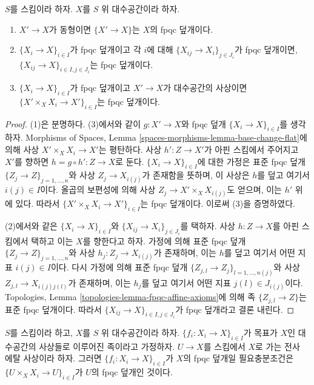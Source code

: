 \begin{lemma}
\label{lemma-fpqc}
$S$를 스킴이라 하자. $X$를 $S$ 위 대수공간이라 하자.
\begin{enumerate}
\item $X' \to X$가 동형이면 $\{X' \to X\}$는 $X$의 fpqc 덮개이다.
\item $\{X_i \to X\}_{i\in I}$가 fpqc 덮개이고 각 $i$에 대해
$\{X_{ij} \to X_i\}_{j\in J_i}$가 fpqc 덮개이면,
$\{X_{ij} \to X\}_{i \in I, j\in J_i}$는 fpqc 덮개이다.
\item $\{X_i \to X\}_{i\in I}$가 fpqc 덮개이고 $X' \to X$가
대수공간의 사상이면
$\{X' \times_X X_i \to X'\}_{i\in I}$는 fpqc 덮개이다.
\end{enumerate}
\end{lemma}

\begin{proof}
(1)은 분명하다. (3)에서와 같이 $g : X' \to X$와 fpqc 덮개
$\{X_i \to X\}_{i\in I}$를 생각하자. Morphisms of Spaces, Lemma
\ref{spaces-morphisms-lemma-base-change-flat}에 의해 사상
$X' \times_X X_i \to X'$는 평탄하다. 사상 $h' : Z \to X'$가 아핀
스킴에서 주어지고 $X'$를 향하면 $h = g \circ h' : Z \to X$로 둔다.
$\{X_i \to X\}_{i\in I}$에 대한 가정은 표준 fpqc 덮개
$\{Z_j \to Z\}_{j = 1, \ldots, n}$와 사상 $Z_j \to X_{i(j)}$가
존재함을 뜻하며, 이 사상은 $h$를 덮고 여기서 $i(j) \in I$이다. 올곱의
보편성에 의해 사상 $Z_j \to X' \times_X X_{i(j)}$도 얻으며, 이는
$h'$ 위에 있다. 따라서 $\{X' \times_X X_i \to X'\}_{i\in I}$는 fpqc
덮개이다. 이로써 (3)을 증명하였다.

\medskip\noindent
(2)에서와 같은 $\{X_i \to X\}_{i\in I}$와
$\{X_{ij} \to X_i\}_{j\in J_i}$를 택하자. 사상 $h : Z \to X$를 아핀
스킴에서 택하고 이는 $X$를 향한다고 하자. 가정에 의해 표준 fpqc 덮개
$\{Z_j \to Z\}_{j = 1, \ldots, n}$와 사상
$h_j : Z_j \to X_{i(j)}$가 존재하며, 이는 $h$를 덮고 여기서 어떤 지표
$i(j) \in I$이다. 다시 가정에 의해 표준 fpqc 덮개
$\{Z_{j, l} \to Z_j\}_{l = 1, \ldots, n(j)}$와 사상
$Z_{j, l} \to X_{i(j)j(l)}$가 존재하며, 이는 $h_j$를 덮고 여기서 어떤
지표 $j(l) \in J_{i(j)}$이다. Topologies, Lemma
\ref{topologies-lemma-fpqc-affine-axioms}에 의해 족
$\{Z_{j, l} \to Z\}$는 표준 fpqc 덮개이다. 따라서
$\{X_{ij} \to X\}_{i \in I, j\in J_i}$가 fpqc 덮개라고 결론 내린다.
\end{proof}

\begin{lemma}
\label{lemma-recognize-fpqc-covering}
$S$를 스킴이라 하고, $X$를 $S$ 위 대수공간이라 하자.
$\{f_i : X_i \to X\}_{i \in I}$가 목표가 $X$인 대수공간의 사상들로
이루어진 족이라고 가정하자. $U \to X$를 스킴에서 $X$로 가는 전사 에탈
사상이라 하자. 그러면 $\{f_i : X_i \to X\}_{i \in I}$가 $X$의 fpqc
덮개일 필요충분조건은 $\{U \times_X X_i \to U\}_{i \in I}$가 $U$의
fpqc 덮개인 것이다.
\end{lemma}

